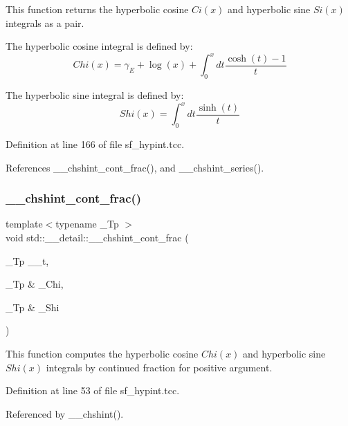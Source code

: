 This function returns the hyperbolic cosine $ Ci(x) $ and hyperbolic sine $ Si(x) $ integrals as a pair. 

The hyperbolic cosine integral is defined by\+: \[ Chi(x) = \gamma_E + \log(x) + \int_0^x dt \frac{\cosh(t) - 1}{t} \]

The hyperbolic sine integral is defined by\+: \[ Shi(x) = \int_0^x dt \frac{\sinh(t)}{t} \] 

Definition at line 166 of file sf\+\_\+hypint.\+tcc.



References \+\_\+\+\_\+chshint\+\_\+cont\+\_\+frac(), and \+\_\+\+\_\+chshint\+\_\+series().

\mbox{\label{namespacestd_1_1____detail_a07da2303d36d77bfad393a7b8ebdf686}} 
\subsubsection{\texorpdfstring{\+\_\+\+\_\+chshint\+\_\+cont\+\_\+frac()}{\_\_chshint\_cont\_frac()}}
{\footnotesize\ttfamily template$<$typename \+\_\+\+Tp $>$ \\
void std\+::\+\_\+\+\_\+detail\+::\+\_\+\+\_\+chshint\+\_\+cont\+\_\+frac (\begin{DoxyParamCaption}\item[{\+\_\+\+Tp}]{\+\_\+\+\_\+t,  }\item[{\+\_\+\+Tp \&}]{\+\_\+\+Chi,  }\item[{\+\_\+\+Tp \&}]{\+\_\+\+Shi }\end{DoxyParamCaption})}



This function computes the hyperbolic cosine $ Chi(x) $ and hyperbolic sine $ Shi(x) $ integrals by continued fraction for positive argument. 



Definition at line 53 of file sf\+\_\+hypint.\+tcc.



Referenced by \+\_\+\+\_\+chshint().

\mbox{\label{namespacestd_1_1____detail_a16055b6e4baa35ffe5c6d9495d9d0158}} 
